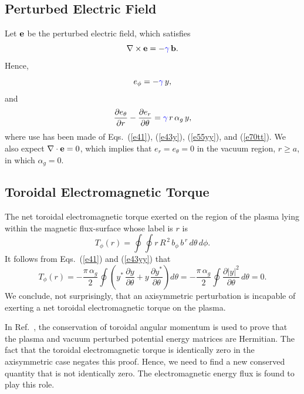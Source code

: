 \documentclass[12pt,prb,aps]{revtex4-1}
\begin{document}
\subsection{Perturbed Electric Field}
Let ${\bf e}$ be the perturbed electric field, which satisfies 
\begin{equation}
\nabla\times {\bf e} =-\textcolor{blue}{\gamma}\,{\bf b}.
\end{equation}
Hence,
\begin{equation}\label{ephi}
e_\phi = -\textcolor{blue}{\gamma}\,y,
\end{equation}
and 
\begin{equation}\label{e81op}
\frac{\partial e_\theta}{\partial r} - \frac{\partial e_r}{\partial\theta} = \textcolor{blue}{\gamma}\,r\,\alpha_g\,y,
\end{equation}
where use has been made of Eqs.~(\ref{e41}), (\ref{e43y}),  (\ref{e55yy}), and (\ref{e70tt}). 
We also expect $\nabla\cdot{\bf e} =0$, which implies that 
$e_r=e_\theta=0$ in the vacuum region, $r\geq a$, in which $\alpha_g=0$. 

\subsection{Toroidal Electromagnetic Torque}\label{storque}
The net toroidal electromagnetic torque exerted on the region of the plasma lying within the magnetic flux-surface whose label is $r$ is\,\cite{tj}
\begin{equation}
T_\phi(r)= \oint\oint r\,R^{\,2}\,b_\phi\,b^{\,r}\,d\theta\,d\phi.
\end{equation}
It follows from Eqs.~(\ref{e41}) and (\ref{e43yy}) that 
\begin{equation}
T_\phi(r) = -\frac{\pi\,\alpha_g}{2}\oint\left(y^\ast\,\frac{\partial y}{\partial\theta}+y\,\frac{\partial y^\ast}{\partial\theta}\right)d\theta
= -\frac{\pi\,\alpha_g}{2}\oint\frac{\partial|y|^2}{\partial\theta}\,d\theta = 0.
\end{equation}
We conclude, not surprisingly,  that an axisymmetric perturbation is incapable of exerting a net toroidal electromagnetic torque on the plasma. 

In Ref.~, the conservation of toroidal angular momentum is used to prove that the plasma and vacuum perturbed potential energy matrices are Hermitian.
The fact that the toroidal electromagnetic torque is identically  zero in the axisymmetric case negates this proof. Hence, we need to find a new conserved quantity
that is not identically zero. The electromagnetic energy flux is found to play this role. 
\end{document}
